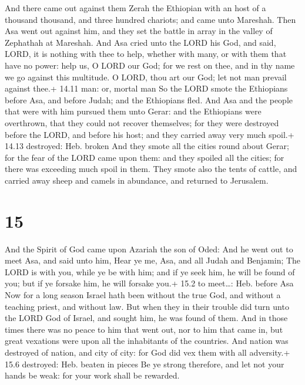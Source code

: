  And there came out against them Zerah the Ethiopian with
an host of a thousand thousand, and three hundred chariots; and came
unto Mareshah.  Then Asa went out against him, and they set
the battle in array in the valley of Zephathah at Mareshah.
 And Asa cried unto the LORD his God, and said, LORD, it is
nothing with thee to help, whether with many, or with them that have no
power: help us, O LORD our God; for we rest on thee, and in thy name we
go against this multitude. O LORD, thou art our God; let not man prevail
against thee.+ 14.11 man: or, mortal man  So the LORD smote
the Ethiopians before Asa, and before Judah; and the Ethiopians fled.
 And Asa and the people that were with him pursued them
unto Gerar: and the Ethiopians were overthrown, that they could not
recover themselves; for they were destroyed before the LORD, and before
his host; and they carried away very much spoil.+ 14.13 destroyed: Heb.
broken  And they smote all the cities round about Gerar;
for the fear of the LORD came upon them: and they spoiled all the
cities; for there was exceeding much spoil in them.  They
smote also the tents of cattle, and carried away sheep and camels in
abundance, and returned to Jerusalem.

\hypertarget{section-14}{%
\section{15}\label{section-14}}

 And the Spirit of God came upon Azariah the son of Oded:
 And he went out to meet Asa, and said unto him, Hear ye me,
Asa, and all Judah and Benjamin; The LORD is with you, while ye be with
him; and if ye seek him, he will be found of you; but if ye forsake him,
he will forsake you.+ 15.2 to meet\ldots: Heb. before Asa 
Now for a long season Israel hath been without the true God, and without
a teaching priest, and without law.  But when they in their
trouble did turn unto the LORD God of Israel, and sought him, he was
found of them.  And in those times there was no peace to him
that went out, nor to him that came in, but great vexations were upon
all the inhabitants of the countries.  And nation was
destroyed of nation, and city of city: for God did vex them with all
adversity.+ 15.6 destroyed: Heb. beaten in pieces  Be ye
strong therefore, and let not your hands be weak: for your work shall be
rewarded.

